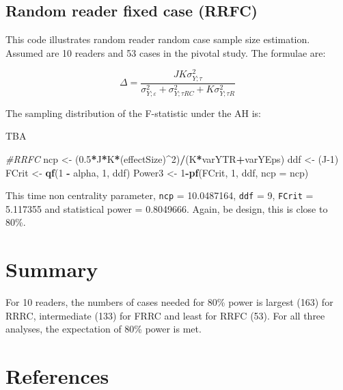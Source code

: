 \documentclass[]{book}
\newenvironment{Shaded}{\begin{snugshade}}{\end{snugshade}}
\newcommand{\CommentTok}[1]{\textcolor[rgb]{0.56,0.35,0.01}{\textit{#1}}}
\newcommand{\DataTypeTok}[1]{\textcolor[rgb]{0.13,0.29,0.53}{#1}}
\newcommand{\DecValTok}[1]{\textcolor[rgb]{0.00,0.00,0.81}{#1}}
\newcommand{\FloatTok}[1]{\textcolor[rgb]{0.00,0.00,0.81}{#1}}
\newcommand{\KeywordTok}[1]{\textcolor[rgb]{0.13,0.29,0.53}{\textbf{#1}}}
\newcommand{\NormalTok}[1]{#1}
\newcommand{\OperatorTok}[1]{\textcolor[rgb]{0.81,0.36,0.00}{\textbf{#1}}}
\newcommand{\StringTok}[1]{\textcolor[rgb]{0.31,0.60,0.02}{#1}}
\begin{document}
\hypertarget{random-reader-fixed-case-rrfc}{%
\subsection{Random reader fixed case (RRFC)}\label{random-reader-fixed-case-rrfc}}

This code illustrates random reader random case sample size estimation. Assumed are 10 readers and 53 cases in the pivotal study. The formulae are:

\[\Delta =\frac{JK\sigma _{Y;\tau }^{2}}{\sigma _{Y;\varepsilon }^{2}+\sigma _{Y;\tau RC}^{2}+K\sigma _{Y;\tau R}^{2}}\]

The sampling distribution of the F-statistic under the AH is:

TBA

\begin{Shaded}
\begin{Highlighting}[]
\CommentTok{#RRFC}
\NormalTok{ncp <-}\StringTok{ }\NormalTok{(}\FloatTok{0.5}\OperatorTok{*}\NormalTok{J}\OperatorTok{*}\NormalTok{K}\OperatorTok{*}\NormalTok{(effectSize)}\OperatorTok{^}\DecValTok{2}\NormalTok{)}\OperatorTok{/}\NormalTok{(K}\OperatorTok{*}\NormalTok{varYTR}\OperatorTok{+}\NormalTok{varYEps)}
\NormalTok{ddf <-}\StringTok{ }\NormalTok{(J}\DecValTok{-1}\NormalTok{)}
\NormalTok{FCrit <-}\StringTok{ }\KeywordTok{qf}\NormalTok{(}\DecValTok{1} \OperatorTok{-}\StringTok{ }\NormalTok{alpha, }\DecValTok{1}\NormalTok{, ddf)}
\NormalTok{Power3 <-}\StringTok{ }\DecValTok{1}\OperatorTok{-}\KeywordTok{pf}\NormalTok{(FCrit, }\DecValTok{1}\NormalTok{, ddf, }\DataTypeTok{ncp =}\NormalTok{ ncp)}
\end{Highlighting}
\end{Shaded}

This time non centrality parameter, \texttt{ncp} = 10.0487164, \texttt{ddf} = 9, \texttt{FCrit} = 5.117355 and statistical power = 0.8049666. Again, be design, this is close to 80\%.

\hypertarget{summary-5}{%
\section{Summary}\label{summary-5}}

For 10 readers, the numbers of cases needed for 80\% power is largest (163) for RRRC, intermediate (133) for FRRC and least for RRFC (53). For all three analyses, the expectation of 80\% power is met.

\hypertarget{references-7}{%
\section{References}\label{references-7}}
\end{document}
